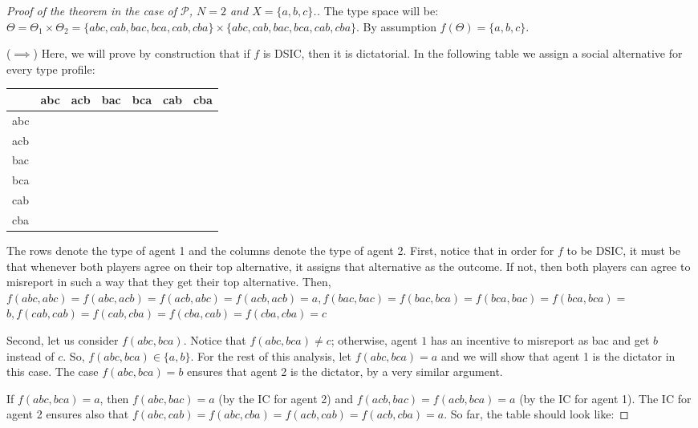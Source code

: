 \documentclass[11pt,leqno]{article}
\begin{document}
\begin{proof}[Proof of the theorem in the case of $\mathcal{P}$, $N=2$ and $X=\{a,b,c\}$.]
    The type space will be: $\Theta=\Theta_1 \times \Theta_2=\{a b c, c a b, b a c, b c a, c a b, c b a\} \times\{a b c, c a b, b a c, b c a, c a b, c b a\}$. By assumption $f(\Theta)=\{a, b, c\}$. 
    
    ($\implies$) Here, we will prove by construction that if $f$ is DSIC, then it is dictatorial. In the following table we assign a social alternative for every type profile:
\begin{table}[http]
    \centering
    \begin{tabular}{l|l|l|l|l|l|l}
\hline & abc & acb & bac & bca & cab & cba \\
\hline abc & & & & & & \\
\hline acb & & & & & & \\
\hline bac & & & & & & \\
\hline bca & & & & & & \\
\hline cab & & & & & & \\
\hline cba & & & & & & \\
\hline
\end{tabular}
\end{table}

The rows denote the type of agent 1 and the columns denote the type of agent 2. First, notice that in order for $f$ to be DSIC, it must be that whenever both players agree on their top alternative, it assigns that alternative as the outcome. If not, then both players can agree to misreport in such a way that they get their top alternative. Then, $f(a b c, a b c)=f(a b c, a c b)=f(a c b, a b c)=f(a c b, a c b)=a, f(b a c, b a c)=f(b a c, b c a)=f(b c a, b a c)=f(b c a, b c a)=$ $b, f(c a b, c a b)=f(c a b, c b a)=f(c b a, c a b)=f(c b a, c b a)=c$

Second, let us consider $f(a b c, b c a)$. Notice that $f(a b c, b c a) \neq c$; otherwise, agent $1$ has an incentive to misreport as bac and get $b$ instead of $c$. So, $f(a b c, b c a) \in\{a, b\}$. For the rest of this analysis, let $f(a b c, b c a)=a$ and we will show that agent 1 is the dictator in this case. The case $f(a b c, b c a)=b$ ensures that agent 2 is the dictator, by a very similar argument.

If $f(a b c, b c a)=a$, then $f(a b c, b a c)=a$ (by the IC for agent 2) and $f(a c b, b a c)=f(a c b, b c a)=a$ (by the IC for agent 1). The IC for agent 2 ensures also that $f(a b c, c a b)=f(a b c, c b a)=f(a c b, c a b)=f(a c b, c b a)=a$. So far, the table should look like:


\end{proof}
\end{document}
